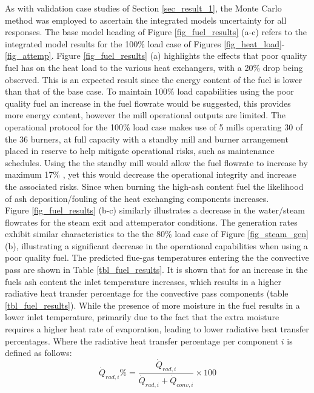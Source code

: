\documentclass[a4paper,fleqn]{cas-dc}
\begin{document}
As with validation case studies of Section \ref{sec_result_1}, the Monte Carlo method was employed to ascertain the integrated models uncertainty for all responses. The base model heading of Figure \ref{fig_fuel_results} (a-c) refers to the integrated model results for the 100\% load case of Figures \ref{fig_heat_load}-\ref{fig_attemp}. Figure \ref{fig_fuel_results}  (a) highlights the effects that poor quality fuel has on the heat load to the various heat exchangers, with a 20\% drop being observed. This is an expected result since the energy content of the fuel is lower than that of the base case. To maintain 100\% load capabilities using the poor quality fuel an increase in the fuel flowrate would be suggested, this provides more energy content, however the mill operational outputs are limited. The operational protocol for the 100\% load case makes use of 5 mills operating 30 of the 36 burners, at full capacity with a standby mill and burner arrangement placed in reserve to help mitigate operational risks, such as maintenance schedules. Using the the standby mill would allow the fuel flowrate to increase by maximum 17\% , yet this would decrease the operational integrity and increase the associated risks. Since when burning the high-ash content fuel the likelihood of ash deposition/fouling of the heat exchanging components increases.\\

Figure \ref{fig_fuel_results} (b-c) similarly illustrates a decrease in the water/steam flowrates for the steam exit and attemperator conditions. The generation rates exhibit similar characteristics to the the 80\% load case of Figure \ref{fig_steam_gen} (b), illustrating a significant decrease in the operational capabilities when using a poor quality fuel. The predicted flue-gas temperatures entering the the convective pass are shown in Table \ref{tbl_fuel_results}. It is shown that for an increase in the fuels ash content the inlet temperature increases, which results in a higher radiative heat transfer percentage for the convective pass components (table \ref{tbl_fuel_results}). While the presence of more moisture in the fuel results in a lower inlet temperature, primarily due to the fact that the extra moisture requires a higher heat rate of evaporation, leading to lower radiative heat transfer percentages. Where the radiative heat transfer percentage per component $i$ is defined as follows: \\
\begin{equation}
\dot{Q}_{rad,i}\% = \frac{\dot{Q}_{rad,i}}{\dot{Q}_{rad,i}+\dot{Q}_{conv,i}}\times 100
\end{equation}
\end{document}
